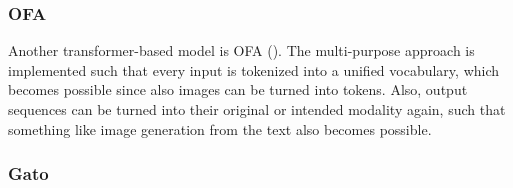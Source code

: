 \documentclass[
]{krantz}
\begin{document}
\hypertarget{ofa}{%
\subsubsection{OFA}\label{ofa}}

Another transformer-based model is OFA (\citet{Wang2022}). The multi-purpose approach is implemented such that every input is tokenized into a unified vocabulary, which becomes possible since also images can be turned into tokens. Also, output sequences can be turned into their original or intended modality again, such that something like image generation from the text also becomes possible.

\hypertarget{gato}{%
\subsubsection{Gato}\label{gato}}
\end{document}
